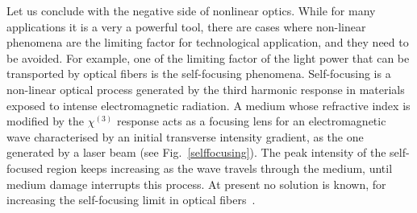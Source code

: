 Let us conclude with the negative side of nonlinear optics. While for many applications it is a very a powerful tool, there are cases where non-linear phenomena are the limiting factor for technological application, and they need to be avoided. 
For example, one of the limiting factor of the light power that can be transported by optical fibers is the self-focusing phenomena. Self-focusing is a non-linear optical process generated by the third harmonic response in materials exposed to intense electromagnetic radiation. 
A medium whose refractive index is modified by the $\chi^{(3)}$ response acts as a focusing lens for an electromagnetic wave characterised by an initial transverse intensity gradient, as the one generated by a laser beam (see Fig.~\ref{selffocusing}). 
The peak intensity of the self-focused region keeps increasing as the wave travels through the medium, until medium damage interrupts this process. At present no solution is known, for increasing the self-focusing limit in optical fibers~\cite{encylaser}.

